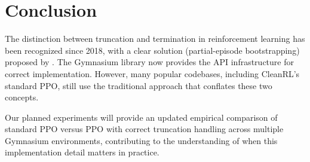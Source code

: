 \documentclass[11pt,a4paper]{article}
\begin{document}
\section{Conclusion}

The distinction between truncation and termination in reinforcement learning has been recognized since 2018, with a clear solution (partial-episode bootstrapping) proposed by \citet{pardo2018time}. The Gymnasium library now provides the API infrastructure for correct implementation. However, many popular codebases, including CleanRL's standard PPO, still use the traditional approach that conflates these two concepts.

Our planned experiments will provide an updated empirical comparison of standard PPO versus PPO with correct truncation handling across multiple Gymnasium environments, contributing to the understanding of when this implementation detail matters in practice.



\end{document}
